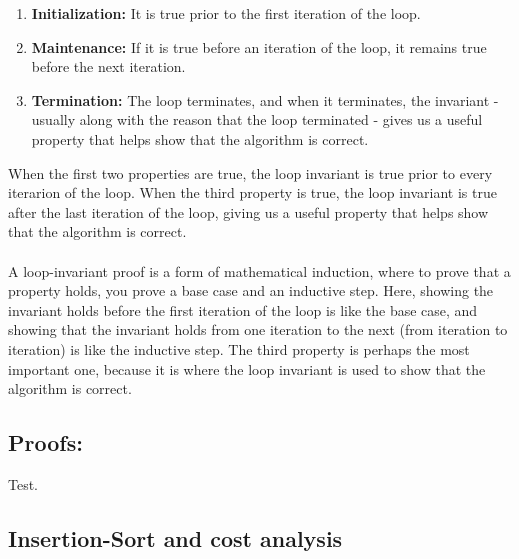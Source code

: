 \begin{enumerate}
  \item \textbf{Initialization:} It is true prior to the first iteration of the loop.
  \item \textbf{Maintenance:} If it is true before an iteration of the loop, it remains true before the next iteration.
  \item \textbf{Termination:} The loop terminates, and when it terminates, the invariant - usually along with the reason that the loop terminated - gives us a useful property that helps show that the algorithm is correct.
\end{enumerate}
When the first two properties are true, the loop invariant is true prior to every iterarion of the loop. When the third property is true, the loop invariant is true after the last iteration of the loop, giving us a useful property that helps show that the algorithm is correct.
\\ \\
A loop-invariant proof is a form of mathematical induction, where to prove that a property holds, you prove a base case and an inductive step. Here, showing the invariant holds before the first iteration of the loop is like the base case, and showing that the invariant holds from one iteration to the next (from iteration to iteration) is like the inductive step. The third property is perhaps the most important one, because it is where the loop invariant is used to show that the algorithm is correct.



\subsection{Proofs:}
Test.

\subsection{Insertion-Sort and cost analysis}

